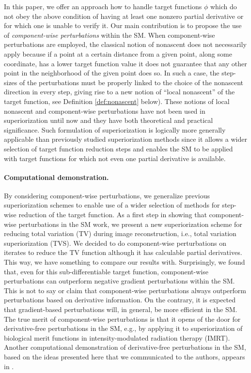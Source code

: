 \documentclass[smallextended]{svjour3}      %
\begin{document}
In this paper, we offer an approach how to handle target functions $\phi$ which do not obey the above condition of having at least one nonzero partial derivative or for which one is unable to verify it. Our main contribution is to propose the use of \textit{component-wise perturbations} within the SM. When component-wise perturbations are employed, the classical notion of nonascent does not necessarily apply because if a point at a certain distance from a given point, along some coordinate, has a lower target function value it does not guarantee that any other point in the neighborhood of the given point does so. In such a case, the step-sizes of the perturbations must be properly linked to the choice of the nonascent direction in every step, giving rise to a new notion of ``local nonascent'' of the target function, see Definition \ref{def:nonascent} below). These notions of local nonascent and component-wise perturbations have not been used in superiorization until now and they have both theoretical and practical significance. Such formulation of superiorization is logically more generally applicable than previously studied superiorization methods since it allows a wider selection of target function reduction steps and enables the SM to be applied with target functions for which not even one partial derivative is available.

\paragraph{\textbf{Computational demonstration}.}
By considering component-wise perturbations, we generalize previous superiorization schemes to enable use of a wider selection of methods for step-wise reduction of the target function. As a first step in showing that component-wise perturbations in the SM work, we present a new superiorization scheme for reducing total variation (TV) during image reconstruction, i.e., total variation superiorization (TVS). We decided to do component-wise perturbations on iterates to reduce the TV function although it has calculable partial derivatives. This way, we  have something to compare our results with. Surprisingly, we found that, even for this sub-differentiable target function, component-wise perturbations can outperform negative gradient perturbations within the SM. This is not to say or claim that component-wise perturbations always outperform perturbations based on derivative information. On the contrary, it is expected that gradient-based perturbations will, in general, be more efficient in the SM. The true merit of component-wise perturbations is that it opens of the door for derivative-free perturbations in the SM, e.g., by applying it to superiorization of biological merit functions in intensity-modulated radiation therapy (IMRT). Another computational demonstration of derivative-free perturbations in the SM, based on the ideas presented here that we communicated to the authors, appears in \cite[Section 4.3]{gibalipetra2017}.
\end{document}
